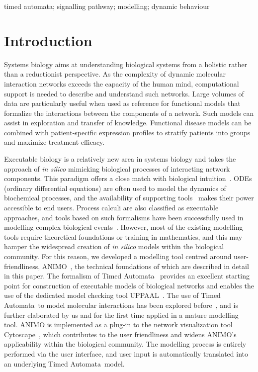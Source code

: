 \documentclass[journal, 10pt]{IEEEtran}
\def\tas{Timed Automata}
\begin{document}
\begin{IEEEkeywords}
 timed automata; signalling pathway; modelling; dynamic behaviour
\end{IEEEkeywords}

\IEEEpeerreviewmaketitle


\section{Introduction}\label{sec:introduction}

Systems biology aims at understanding biological systems from a holistic rather than a reductionist perspective.
As the complexity of dynamic molecular interaction networks exceeds the capacity of the human mind, 
computational support is needed to describe and understand such networks.
Large volumes of data are particularly useful when used as reference for functional models
that formalize the interactions between the components of a network.
Such models can assist in exploration and transfer of knowledge. 
Functional disease models can be combined with patient-specific expression profiles to stratify 
patients into groups and maximize treatment efficacy.

Executable biology is a relatively new area in systems biology and takes the approach of \emph{in silico} mimicking biological processes of interacting 
network components. This paradigm offers a close match with biological intuition~\cite{ex-bio}.
ODEs (ordinary differential equations) are often used to model the dynamics of biochemical processes,
and the availability of supporting tools~\cite{copasi,gna,e-cell} makes their power accessible to end users.
Process calculi are also classified as executable approaches, and tools based on such formalisms have been successfully
used in modelling complex biological events~\cite{biopepa-nfkb,blenx-parkinson}.
However, most of the existing modelling tools require theoretical foundations or training in mathematics,
and this may hamper the widespread creation of \emph{in silico} models within the biological community.
For this reason, we developed a modelling tool centred around user-friendliness, ANIMO~\cite{animo-site}, the technical foundations of which are described 
in detail in this paper. The formalism of \tas~\cite{timed-automata-alur} provides an excellent starting point for 
construction of executable models of biological networks and enables the use of the dedicated model checking tool UPPAAL~\cite{uppaal}.
The use of \tas\ to model molecular interactions has been explored before~\cite{bartocci-oscillators,ta-siebert,oded-ta-discretization}, and is further elaborated by us 
and for the first time applied in a mature modelling tool. ANIMO is implemented as a plug-in to the 
network visualization tool Cytoscape~\cite{cytoscape}, which contributes to the user friendliness and widens ANIMO's 
applicability within the biological community. The modelling process is entirely performed via the user interface, and user input is 
automatically translated into an underlying \tas\ model.
\end{document}
